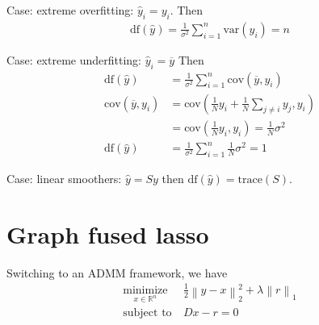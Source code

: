 \documentclass{article}
\newcommand{\obar}[1]{\ensuremath{\overline{ #1 }}}
\newcommand{\op}[2]{{\ensuremath{\underset{ #2 }{\operatorname{ #1 }}~}}}
\newcommand{\norm}[1]{{ \ensuremath{ \left\lVert  #1 \right\rVert  }  }}
\begin{document}
Case: extreme overfitting: $\hat{y}_i=y_i$. Then
\begin{align*}
\textrm{df}(\hat{y}) = \frac{1}{\sigma^2}\sum_{i=1}^n \textrm{var}(y_i)=n
\end{align*}

Case: extreme underfitting: $\hat{y}_i=\obar{y}$ Then
\begin{align*}
\textrm{df}(\hat{y}) &= \frac{1}{\sigma^2}\sum_{i=1}^n \textrm{cov}(\obar{y}, y_i)\\
\textrm{cov}(\obar{y}, y_i)  &=  \textrm{cov}\left( \frac{1}{N}y_i + \frac{1}{N}\sum_{j\neq i}y_j, y_i \right)\\
&=\textrm{cov}\left(\frac{1}{N} y_i, y_i\right)=\frac{1}{N}\sigma^2\\
\textrm{df}(\hat{y})&=\frac{1}{\sigma^2}\sum_{i=1}^n \frac{1}{N}\sigma^2 = 1
\end{align*}

Case: linear smoothers: $\hat{y}=Sy$ then $\textrm{df}(\hat{y}) = \textrm{trace}(S)$.


\section{Graph fused lasso}
Switching to an ADMM framework, we have
\begin{align*}
\op{minimize}{x\in \mathbb{R}^n}&  \frac{1}{2}\norm{y-x}_2^2 + \lambda \norm{r}_1\\
\textrm{subject to}~& Dx-r=0
\end{align*}





\end{document}
